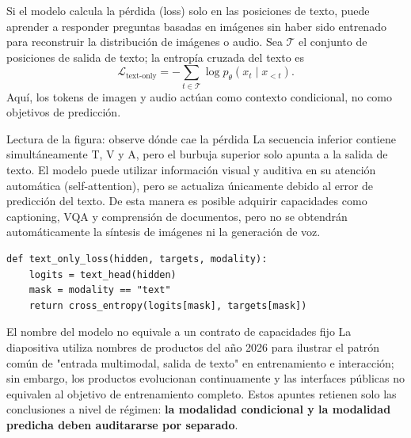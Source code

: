 Si el modelo calcula la pérdida (loss) solo en las posiciones de texto, puede aprender a responder preguntas basadas en imágenes sin haber sido entrenado para reconstruir la distribución de imágenes o audio. Sea $\mathcal{T}$ el conjunto de posiciones de salida de texto; la entropía cruzada del texto es
$$
\mathcal{L}_{\text{text-only}}
=-\sum_{t\in\mathcal{T}}\log p_\theta(x_t\mid x_{<t}).
$$
Aquí, los tokens de imagen y audio actúan como contexto condicional, no como objetivos de predicción.


\begin{knowledgebox}{Lectura de la figura: observe dónde cae la pérdida}
La secuencia inferior contiene simultáneamente T, V y A, pero el burbuja superior solo apunta a la salida de texto. El modelo puede utilizar información visual y auditiva en su atención automática (self-attention), pero se actualiza únicamente debido al error de predicción del texto. De esta manera es posible adquirir capacidades como captioning, VQA y comprensión de documentos, pero no se obtendrán automáticamente la síntesis de imágenes ni la generación de voz.
\end{knowledgebox}

\begin{lstlisting}[caption={Calcular entropía cruzada solo para las posiciones de salida de texto}]
def text_only_loss(hidden, targets, modality):
    logits = text_head(hidden)
    mask = modality == "text"
    return cross_entropy(logits[mask], targets[mask])
\end{lstlisting}


\begin{warningbox}{El nombre del modelo no equivale a un contrato de capacidades fijo}
La diapositiva utiliza nombres de productos del año 2026 para ilustrar el patrón común de "entrada multimodal, salida de texto" en entrenamiento e interacción; sin embargo, los productos evolucionan continuamente y las interfaces públicas no equivalen al objetivo de entrenamiento completo. Estos apuntes retienen solo las conclusiones a nivel de régimen: \textbf{la modalidad condicional y la modalidad predicha deben auditararse por separado}.
\end{warningbox}

